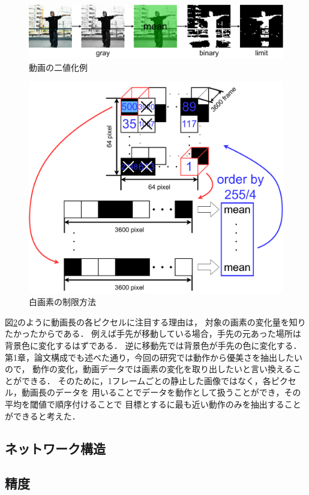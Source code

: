 \begin{figure}[b]
  \begin{center}
    \includegraphics[width=120mm]{images/chart/binary.pdf}
  \end{center}
  \caption{動画の二値化例}
  \label{binary}
\end{figure}
\clearpage

\begin{figure}[t]
  \begin{center}
    \includegraphics[width=120mm]{images/chart/choice.pdf}
  \end{center}
  \caption{白画素の制限方法}
  \label{choice}
\end{figure}

図\ref{choice}のように動画長の各ピクセルに注目する理由は，
対象の画素の変化量を知りたかったからである．
例えば手先が移動している場合，手先の元あった場所は背景色に変化するはずである．
逆に移動先では背景色が手先の色に変化する．
第1章，論文構成でも述べた通り，今回の研究では動作から優美さを抽出したいので，
動作の変化，動画データでは画素の変化を取り出したいと言い換えることができる．
そのために，1フレームごとの静止した画像ではなく，各ピクセル，動画長のデータを
用いることでデータを動作として扱うことができ，その平均を閾値で順序付けることで
目標とするに最も近い動作のみを抽出することができると考えた．

\subsection{ネットワーク構造}

\subsection{精度}